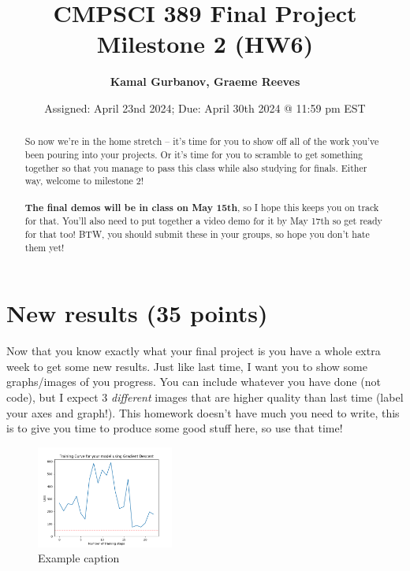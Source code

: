 \documentclass{article}
\begin{document}
\title{CMPSCI 389 Final Project Milestone 2 (HW6)}
\author{\textbf{Kamal Gurbanov, Graeme Reeves}}
\date{Assigned: April 23nd 2024; Due: April 30th 2024 @ 11:59 pm EST}

\maketitle

\begin{abstract}
    So now we're in the home stretch -- it's time for you to show off all of the work you've been pouring into your projects. Or it's time for you to scramble to get something together so that you manage to pass this class while also studying for finals. Either way, welcome to milestone 2! \\ \\
    \textbf{The final demos will be in class on May 15th}, so I hope this keeps you on track for that. You'll also need to put together a video demo for it by May 17th so get ready for that too! BTW, you should submit these in your groups, so hope you don't hate them yet!
    
\end{abstract}

\section{New results (35 points)}

Now that you know exactly what your final project is you have a whole extra week to get some new results. Just like last time, I want you to show some graphs/images of you progress. You can include whatever you have done (not code), but I expect 3 \textit{different} images that are higher quality than last time (label your axes and graph!). This homework doesn't have much you need to write, this is to give you time to produce some good stuff here, so use that time!


\begin{figure}[htb]
    \centering
    \includegraphics[width=0.4\textwidth]{Figs/Example training.png}
    \caption{ Example caption}
    \label{fig:net}
\end{figure}
\end{document}
